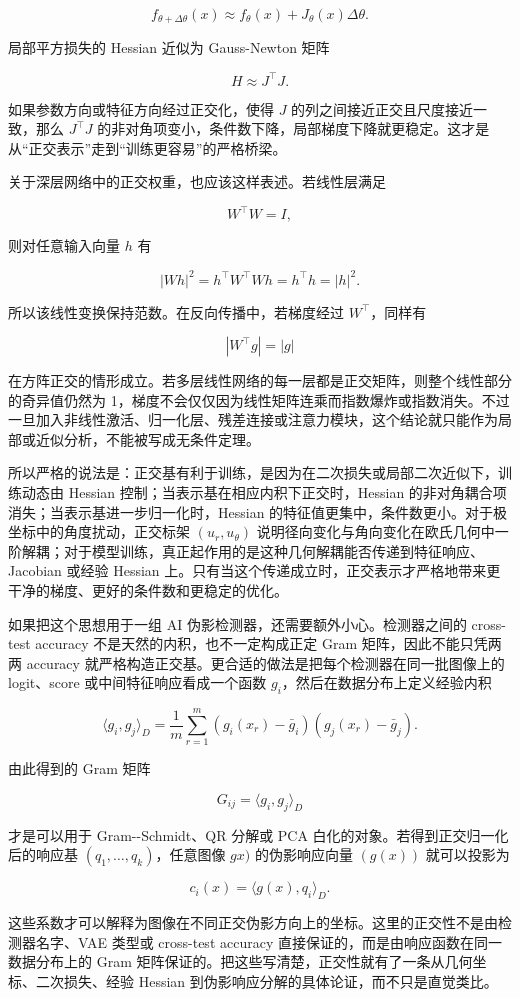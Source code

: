 \[
f_{\theta+\Delta\theta}(x)
\approx f_\theta(x)+J_\theta(x)\Delta\theta.
\]

局部平方损失的 Hessian 近似为 Gauss-Newton 矩阵

\[
H\approx J^\top J.
\]

如果参数方向或特征方向经过正交化，使得 \(J\) 的列之间接近正交且尺度接近一致，那么 \(J^\top J\) 的非对角项变小，条件数下降，局部梯度下降就更稳定。这才是从“正交表示”走到“训练更容易”的严格桥梁。

关于深层网络中的正交权重，也应该这样表述。若线性层满足

\[
W^\top W=I,
\]

则对任意输入向量 \(h\) 有

\[
|Wh|^2=h^\top W^\top Wh=h^\top h=|h|^2.
\]

所以该线性变换保持范数。在反向传播中，若梯度经过 \(W^\top\)，同样有

\[
|W^\top g|=|g|
\]

在方阵正交的情形成立。若多层线性网络的每一层都是正交矩阵，则整个线性部分的奇异值仍然为 1，梯度不会仅仅因为线性矩阵连乘而指数爆炸或指数消失。不过一旦加入非线性激活、归一化层、残差连接或注意力模块，这个结论就只能作为局部或近似分析，不能被写成无条件定理。

所以严格的说法是：正交基有利于训练，是因为在二次损失或局部二次近似下，训练动态由 Hessian 控制；当表示基在相应内积下正交时，Hessian 的非对角耦合项消失；当表示基进一步归一化时，Hessian 的特征值更集中，条件数更小。对于极坐标中的角度扰动，正交标架 \((u_r,u_\theta)\) 说明径向变化与角向变化在欧氏几何中一阶解耦；对于模型训练，真正起作用的是这种几何解耦能否传递到特征响应、Jacobian 或经验 Hessian 上。只有当这个传递成立时，正交表示才严格地带来更干净的梯度、更好的条件数和更稳定的优化。

如果把这个思想用于一组 AI 伪影检测器，还需要额外小心。检测器之间的 cross-test accuracy 不是天然的内积，也不一定构成正定 Gram 矩阵，因此不能只凭两两 accuracy 就严格构造正交基。更合适的做法是把每个检测器在同一批图像上的 logit、score 或中间特征响应看成一个函数 \(g_i\)，然后在数据分布上定义经验内积

\[
\langle g_i,g_j\rangle_D
=\frac{1}{m}\sum_{r=1}^m \left(g_i(x_r)-\bar g_i\right)\left(g_j(x_r)-\bar g_j\right).
\]

由此得到的 Gram 矩阵

\[
G_{ij}=\langle g_i,g_j\rangle_D
\]

才是可以用于 Gram-{}-Schmidt、QR 分解或 PCA 白化的对象。若得到正交归一化后的响应基 \((q_1,\ldots,q_k)\)，任意图像 \(gx)\) 的伪影响应向量 \((g(x))\) 就可以投影为

\[
c_i(x)=\langle g(x),q_i\rangle_D.
\]

这些系数才可以解释为图像在不同正交伪影方向上的坐标。这里的正交性不是由检测器名字、VAE 类型或 cross-test accuracy 直接保证的，而是由响应函数在同一数据分布上的 Gram 矩阵保证的。把这些写清楚，正交性就有了一条从几何坐标、二次损失、经验 Hessian 到伪影响应分解的具体论证，而不只是直觉类比。
